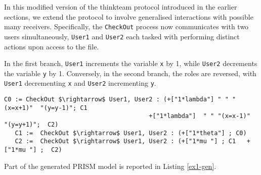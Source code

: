 In this modified version of the thinkteam protocol introduced in the earlier sections, we extend the protocol to involve generalised interactions with possible many receivers. Specifically, the \texttt{CheckOut} process now communicates with two users simultaneously, \texttt{User1} and \texttt{User2} each tasked with performing distinct actions upon access to the file. 

 In the first branch, \texttt{User1} increments the variable \texttt{x} by 1, while \texttt{User2} decrements the variable \texttt{y} by 1. Conversely, in the second branch, the roles are reversed, with \texttt{User1} decrementing \texttt{x} and \texttt{User2} incrementing \texttt{y}.

 \begin{lstlisting}[style=chor-color,breaklines=true, postbreak=\mbox{\textcolor{red}{$\hookrightarrow$}\space},caption={Choreography for the Modified thinkteam Protocol},captionpos=b,label={ex1-chor}]
   C0 := CheckOut $\rightarrow$ User1, User2 : (+["1*lambda"] " " "(x=x+1)"  "(y=y-1)"; C1
                                       	+["1*lambda"]  " " "(x=x-1)"  "(y=y+1)";  C2)
   C1 :=  CheckOut $\rightarrow$ User1, User2 : (+["1*theta"] ; C0)  
   C2 :=  CheckOut $\rightarrow$ User1, User2 : (+["1*mu "] ; C1   +["1*mu "] ;  C2)
 \end{lstlisting}

 Part of the generated PRISM model is reported in Listing \ref{ex1-gen}. 

